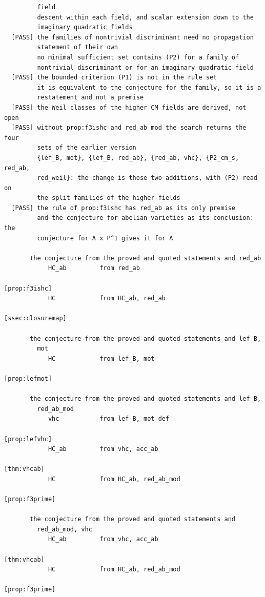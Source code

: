 \begin{small}
\begin{verbatim}
         field
         descent within each field, and scalar extension down to the
         imaginary quadratic fields
  [PASS] the families of nontrivial discriminant need no propagation
         statement of their own
         no minimal sufficient set contains (P2) for a family of
         nontrivial discriminant or for an imaginary quadratic field
  [PASS] the bounded criterion (P1) is not in the rule set
         it is equivalent to the conjecture for the family, so it is a
         restatement and not a premise
  [PASS] the Weil classes of the higher CM fields are derived, not open
  [PASS] without prop:f3ishc and red_ab_mod the search returns the four
         sets of the earlier version
         {lef_B, mot}, {lef_B, red_ab}, {red_ab, vhc}, {P2_cm_s, red_ab,
         red_weil}: the change is those two additions, with (P2) read on
         the split families of the higher fields
  [PASS] the rule of prop:f3ishc has red_ab as its only premise
         and the conjecture for abelian varieties as its conclusion: the
         conjecture for A x P^1 gives it for A

       the conjecture from the proved and quoted statements and red_ab
            HC_ab         from red_ab
                                                             [prop:f3ishc]
            HC            from HC_ab, red_ab
                                                         [ssec:closuremap]

       the conjecture from the proved and quoted statements and lef_B,
         mot
            HC            from lef_B, mot
                                                             [prop:lefmot]

       the conjecture from the proved and quoted statements and lef_B,
         red_ab_mod
            vhc           from lef_B, mot_def
                                                             [prop:lefvhc]
            HC_ab         from vhc, acc_ab
                                                               [thm:vhcab]
            HC            from HC_ab, red_ab_mod
                                                            [prop:f3prime]

       the conjecture from the proved and quoted statements and
         red_ab_mod, vhc
            HC_ab         from vhc, acc_ab
                                                               [thm:vhcab]
            HC            from HC_ab, red_ab_mod
                                                            [prop:f3prime]


\end{verbatim}
\end{small}
